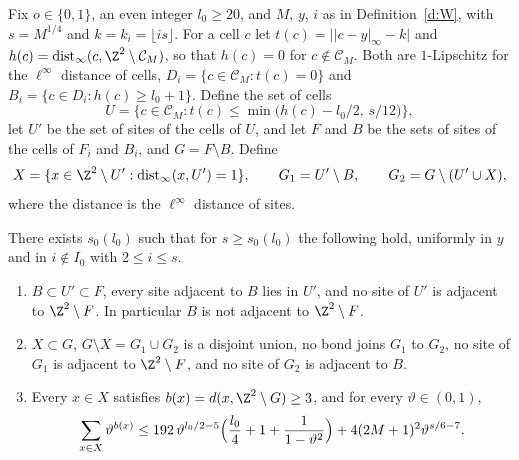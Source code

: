 Fix $o \in \{0, 1\}$, an even integer $l_0 \ge 20$, and $M$, $y$, $i$ as in Definition~\ref{d:W}, with $s = M^{1/4}$ and $k = k_i = \lfloor i s \rfloor$. For a cell $c$ let $t(c) = \bigl| |c - y|_\infty - k \bigr|$ and $h(c) = \operatorname{dist}_\infty(c, \Z^2 \setminus \mathcal C_M)$, so that $h(c) = 0$ for $c \notin \mathcal C_M$. Both are $1$-Lipschitz for the $\ell^\infty$ distance of cells, $D_i = \{ c \in \mathcal C_M : t(c) = 0 \}$ and $B_i = \{ c \in D_i : h(c) \ge l_0 + 1\}$. Define the set of cells
\begin{equation}\label{e:Ucut}
U = \bigl\{ c \in \mathcal C_M : t(c) \le \min\bigl( h(c) - l_0/2, \, s/12 \bigr) \bigr\},
\end{equation}
let $U'$ be the set of sites of the cells of $U$, and let $F$ and $B$ be the sets of sites of the cells of $F_i$ and $B_i$, and $G = F \setminus B$. Define
\begin{equation}\label{e:Xcut}
X = \{ x \in \Z^2 \setminus U' : \operatorname{dist}_\infty(x, U') = 1 \}, \qquad G_1 = U' \setminus B, \qquad G_2 = G \setminus (U' \cup X),
\end{equation}
where the distance is the $\ell^\infty$ distance of sites.

\begin{lemma}\label{l:cutgeom}
There exists $s_0(l_0)$ such that for $s \ge s_0(l_0)$ the following hold, uniformly in $y$ and in $i \notin I_0$ with $2 \le i \le s$.
\begin{enumerate}
\item $B \subset U' \subset F$, every site adjacent to $B$ lies in $U'$, and no site of $U'$ is adjacent to $\Z^2 \setminus F$. In particular $B$ is not adjacent to $\Z^2 \setminus F$.
\item $X \subset G$, $G \setminus X = G_1 \cup G_2$ is a disjoint union, no bond joins $G_1$ to $G_2$, no site of $G_1$ is adjacent to $\Z^2 \setminus F$, and no site of $G_2$ is adjacent to $B$.
\item Every $x \in X$ satisfies $b(x) = d(x, \Z^2 \setminus G) \ge 3$, and for every $\vartheta \in (0, 1)$,
\begin{equation}\label{e:cutsum}
\sum_{x \in X} \vartheta^{b(x)} \le 192 \, \vartheta^{l_0/2 - 5} \Bigl( \frac{l_0}{4} + 1 + \frac{1}{1 - \vartheta^2} \Bigr) + 4 (2M + 1)^2 \vartheta^{s/6 - 7} .
\end{equation}
\end{enumerate}
\end{lemma}

